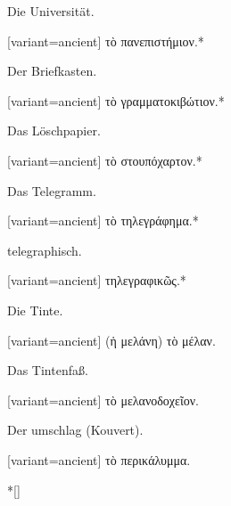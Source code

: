 Die Universität.

\switchcolumn

\begin{greek}[variant=ancient]%
τὸ πανεπιστήμιον.{*}

\end{greek}%
\switchcolumn*

Der Briefkasten.

\switchcolumn

\begin{greek}[variant=ancient]%
τὸ γραμματοκιβώτιον.{*}

\end{greek}%
\switchcolumn*

Das Löschpapier.

\switchcolumn

\begin{greek}[variant=ancient]%
τὸ στουπόχαρτον.{*}

\end{greek}%
\switchcolumn*

Das Telegramm.

\switchcolumn

\begin{greek}[variant=ancient]%
τὸ τηλεγράφημα.{*}

\end{greek}%
\switchcolumn*

telegraphisch.

\switchcolumn

\begin{greek}[variant=ancient]%
τηλεγραφικῶς.{*}

\end{greek}%
\switchcolumn*

Die Tinte.

\switchcolumn

\begin{greek}[variant=ancient]%
(ἡ μελάνη) τὸ μέλαν.

\end{greek}%
\switchcolumn*

Das Tintenfaß.

\switchcolumn

\begin{greek}[variant=ancient]%
τὸ μελανοδοχεῖον.

\end{greek}%
\switchcolumn*

Der umschlag (Kouvert). 

\switchcolumn

\begin{greek}[variant=ancient]%
τὸ περικάλυμμα.

\end{greek}%
\switchcolumn[0]*[\StarOrnament]

